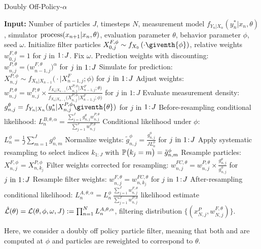 \documentclass{article}
\begin{document}
\begin{algorithm}[H]
\centering
	\caption{Doubly Off-Policy-$\alpha$}
    \label{alg:dop}
	\begin{algorithmic}[1]
	     \STATE \textbf{Input:} Number of particles $J$, timesteps $N$, measurement model $f_{Y_n|X_n}(y_n^*|x_n, \theta)$, simulator $\text{process}(x_{n+1}|x_n, \theta)$, evaluation parameter $\theta$, behavior parameter $\phi$, seed $\omega$.
		\STATE Initialize filter particles ${X}_{0,j}^{F,\phi}\sim {f}_{{X}_{0}}\left(\cdot\giventh{\phi}\right)$, relative weights $w^{F,\theta}_{0,j}= 1$ for $j$ in ${1}\!:\!{J}$. Fix $\omega.$
            \STATE Prediction weights with discounting: $w_{n,j}^{P,\theta} = \big(w_{n-1,j}^{F,\theta}\big)^\alpha$ for $j\ \mathrm{in}\ {1}\!:\!{J}$
            \label{dop-alpha:discount}
            \STATE Simulate for prediction:
            ${X}_{n,j}^{P,\phi}\sim {f}_{{X}_{n}|{X}_{n-1}}\big(\cdot|{X}_{n-1,j}^{F};{\phi}\big)$ for $j\ \mathrm{in}\ {1}\!:\!{J}$ \label{dop-alpha:step1}
            \STATE Adjust weights: $\displaystyle w_{n,j}^{P,\theta} = w_{n,j}^{P,\theta} \times
            \frac{{f}_{{X}_{n}|{X}_{n-1}}\big({X}_{n,j}^{P,\phi}|{X}_{n-1,j}^{F};{\theta}\big)}{{f}_{{X}_{n}|{X}_{n-1}}\big({X}_{n,j}^{P,\phi}|{X}_{n-1,j}^{F};{\phi}\big)}$ for $j$ in $1:J$
            \label{dop-alpha:dproc}
            \STATE Evaluate measurement density:
            $g^{\theta}_{n,j}={f}_{{Y}_{n}|{X}_{n}}(y_{n}^{*}|{X}_{n,j}^{P,\phi}\giventh{\theta})$ for $j$ in ${1}\!:\!{J}$
            \STATE Before-resampling conditional likelihood: $\displaystyle L_n^{B,\theta,\alpha} = \frac{\sum_{j=1}^Jg^\theta_{n,j} w^{P,\theta}_{n,j}}{\sum_{j=1}^J  w^{P,\theta}_{n,j}}$
            \STATE Conditional likelihood under $\phi$: 
            $L_n^{\phi} = \frac{1}{J}\sum_{m=1}^{J}g^{\phi}_{n,m}$
            \label{dop-alpha:Lphi}
            \STATE Normalize weights:
            $\displaystyle \tilde{g}^{\phi}_{n,j}= \frac{g^{\phi}_{n,j}}{JL_n^{\phi}}$
            for $j\ \mathrm{in}\ {1}\!:\!{J}$
            \STATE Apply systematic resampling to select indices $k_{1:J}$ with $\mathbb{P}\big(k_{j}=m\big) =\tilde{g}^{\phi}_{n,m}$ \label{dop-alpha:systematic}
            \STATE Resample particles: ${X}_{n,j}^{F,\phi}={X}_{n,k_{j}}^{P,\phi}$
            \STATE Filter weights corrected for resampling:
            $\displaystyle w^{FC,\theta}_{n,j}= w^{P,\theta}_{n,j} \times \frac{ g^{\theta}_{n,j}}{ g^{\phi}_{n,j}}$ for $j\ \mathrm{in}\ {1}\!:\!{J}$ \label{dop-alpha:weight:update}
            \STATE Resample filter weights:
            $w_{n,j}^{F,\theta}= {w}_{n,k_{j}}^{FC,\theta}$
            for $j$ in ${1}\!:\!{J}$ \label{dop-alpha:step2}
            \STATE After-resampling conditional likelihood: $\displaystyle L_n^{A,\theta,\alpha} = L_n^\phi \, \frac{\sum_{j=1}^J w^{F,\theta}_{n,j}}{\sum_{j=1}^J  w^{P,\theta}_{n,j}}$
            \ENDFOR
		\RETURN likelihood estimate $\hat{\mathcal{L}}(\theta) = \mathcal{L}(\theta, \phi, \omega, J) := \prod_{n=1}^N L_n^{A,\theta,\alpha}$, filtering distribution $\{(x_{N,j}^P, w^{F,\theta}_{N,j})\}.$
	\end{algorithmic}
\end{algorithm}


Here, we consider a doubly off policy particle filter, meaning that both  and  are computed at $\phi$ and particles are reweighted to correspond to $\theta$.
\end{document}
